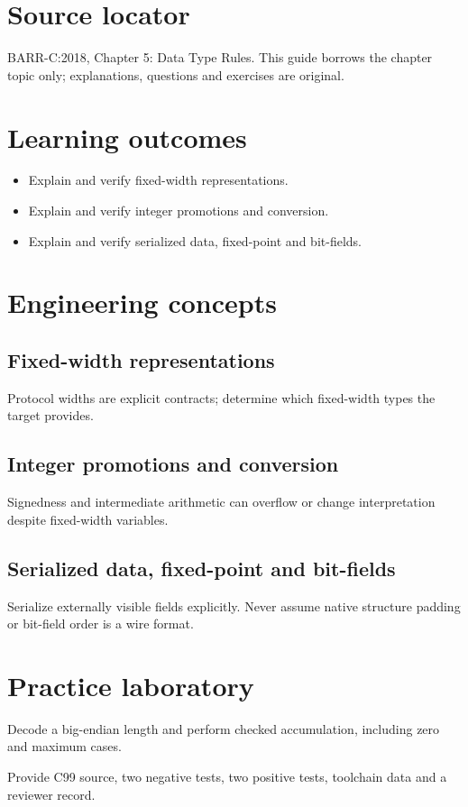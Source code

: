 \documentclass[10pt,letterpaper]{article}
\begin{document}
\makedoctitle
\makedocsummary
\section{Source locator}
BARR-C:2018, Chapter 5: Data Type Rules. This guide borrows the chapter topic only; explanations, questions and exercises are original.
\section{Learning outcomes}
\begin{itemize}
\item Explain and verify fixed-width representations.
\item Explain and verify integer promotions and conversion.
\item Explain and verify serialized data, fixed-point and bit-fields.
\end{itemize}

\section{Engineering concepts}
\subsection{Fixed-width representations}
Protocol widths are explicit contracts; determine which fixed-width types the target provides.

\subsection{Integer promotions and conversion}
Signedness and intermediate arithmetic can overflow or change interpretation despite fixed-width variables.

\subsection{Serialized data, fixed-point and bit-fields}
Serialize externally visible fields explicitly. Never assume native structure padding or bit-field order is a wire format.

\section{Practice laboratory}
Decode a big-endian length and perform checked accumulation, including zero and maximum cases.

Provide C99 source, two negative tests, two positive tests, toolchain data and a reviewer record.
\end{document}
